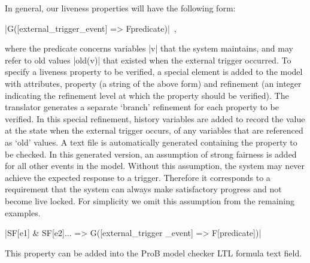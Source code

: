 In general, our liveness properties will have the following form:
\begin{center}
  |G([external_trigger_event] => F{predicate})|~,
\end{center}
where the predicate concerns variables |v| that the system maintains, and may refer to old values |old(v)| that existed when the external trigger occurred.
To specify a liveness property to be verified, a special \LTL element is added to the \SCXML model with attributes, property (a string of the above form)  and refinement (an integer indicating the refinement level at which the property should be verified).
The translator generates a separate `branch' refinement for each \LTL property to be verified. 
In this special refinement, history variables are added to record the value at the state when the external trigger occurs, of any variables that are referenced as `old' values.
A text file is automatically generated containing the \LTL property to be checked. 
In this generated version, an assumption of strong fairness is added for all other events in the model.
Without this assumption, the system may never achieve the expected response to a trigger. 
Therefore it corresponds to a requirement that the system can always make satisfactory progress and not become live locked.
For simplicity we omit this assumption from the remaining examples.
\begin{center}
  |SF[e1] & SF[e2]... => G([external_trigger _event] => F[predicate])|
\end{center}
This property can be added into the ProB model checker LTL formula text field.

